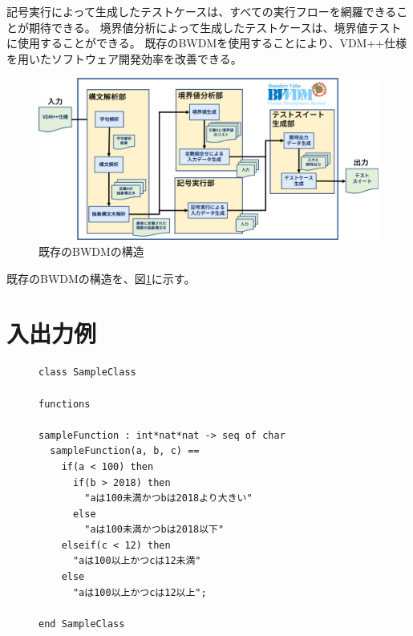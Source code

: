 \documentclass[uplatex, report, a4j, 10pt]{jsbook}
\begin{document}
記号実行によって生成したテストケースは、すべての実行フローを網羅できることが期待できる。
境界値分析によって生成したテストケースは、境界値テストに使用することができる。
既存のBWDMを使用することにより、VDM++仕様を用いたソフトウェア開発効率を改善できる。

\begin{figure}[tp]
  \centering
  \includegraphics[keepaspectratio, width=160mm]{figs/exist_bwdm_structure.png}
  \caption{既存のBWDMの構造}
  \label{fig:existBwdmStructure}
\end{figure}

既存のBWDMの構造を、図\ref{fig:existBwdmStructure}に示す。

\section{入出力例}

\lstset{language=}
\begin{figure}[tp]
  \begin{lstlisting}[caption=VDM++仕様の例,label=fig:input_sample]
class SampleClass

functions

sampleFunction : int*nat*nat -> seq of char
  sampleFunction(a, b, c) == 
    if(a < 100) then
      if(b > 2018) then
        "aは100未満かつbは2018より大きい"
      else
        "aは100未満かつbは2018以下"
    elseif(c < 12) then
      "aは100以上かつcは12未満"
    else
      "aは100以上かつcは12以上";

end SampleClass

\end{lstlisting}
\end{figure}
\end{document}
